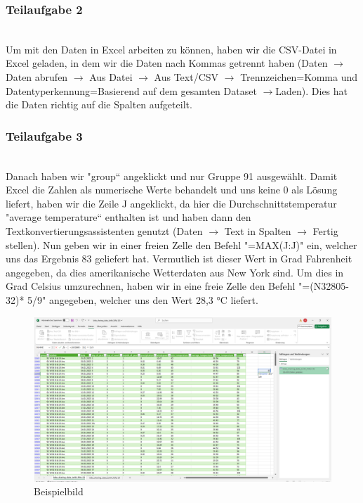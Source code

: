 \documentclass[a4paper,12pt]{article}
\begin{document}
\subsubsection{Teilaufgabe 2}\\
Um mit den Daten in Excel arbeiten zu können, haben wir die CSV-Datei in Excel geladen, in dem wir die Daten nach Kommas getrennt haben (Daten $ \rightarrow $ Daten abrufen $ \rightarrow $ Aus Datei $ \rightarrow $ Aus Text/CSV $ \rightarrow $ Trennzeichen=Komma und Datentyperkennung=Basierend auf dem gesamten Dataset $ \rightarrow $Laden). Dies hat die Daten richtig auf die Spalten aufgeteilt. 
\\
\subsubsection{Teilaufgabe 3} \\Danach haben wir "group“ angeklickt und nur Gruppe 91 ausgewählt. Damit Excel die Zahlen als numerische Werte behandelt und uns keine 0 als Lösung liefert, haben wir die Zeile J angeklickt, da hier die Durchschnittstemperatur "average temperature“ enthalten ist und haben dann den Textkonvertierungsassistenten genutzt (Daten $ \rightarrow $ Text in Spalten $ \rightarrow $ Fertig stellen).  Nun geben wir in einer freien Zelle den Befehl "=MAX(J:J)" ein, welcher uns das Ergebnis 83 geliefert hat. Vermutlich ist dieser Wert in Grad Fahrenheit angegeben, da dies amerikanische Wetterdaten aus New York sind. Um dies in Grad Celsius umzurechnen, haben wir in eine freie Zelle den Befehl "=(N32805-32)* 5/9" angegeben, welcher uns den Wert 28,3 °C liefert. 
\begin{figure}[H]
    \centering
    \includegraphics[width=\textwidth]{image2.png}
    \caption{Beispielbild}
    \label{fig:enter-label}
\end{figure}
\end{document}
